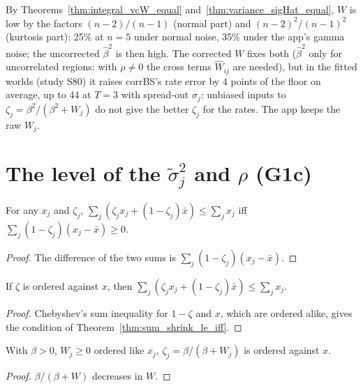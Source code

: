 \begin{remark}\label{rem:vcW}
  By Theorems~\ref{thm:integral_vcW_equal} and~\ref{thm:variance_sigHat_equal}, $W$ is low by the factors
  $(n-2)/(n-1)$ (normal part) and $(n-2)^2/(n-1)^2$ (kurtosis part): 25\% at $n = 5$ under normal noise, 35\%
  under the app's gamma noise; the uncorrected $\hat\beta^2$ is then high. The corrected $W$ fixes both
  ($\hat\beta^2$ only for uncorrelated regions: with $\rho \ne 0$ the cross terms $\hat W_{ij}$ are needed), but in
  the fitted worlds (study S80) it raises corrBS's rate error by 4 points of the floor on average, up to 44
  at $T = 3$ with spread-out $\sigma_j$: unbiased inputs to $\zeta_j = \beta^2/(\beta^2 + W_j)$ do not give the
  better $\zeta_j$ for the rates. The app keeps the raw $W_j$.
\end{remark}

\section{\texorpdfstring{The level of the $\tilde\sigma_j^2$ and $\hat\rho$ (G1c)}{The level of the sigma-tilde and rho-hat (G1c)}}

\begin{theorem}\label{thm:sum_shrink_le_iff}
  \leanok
  For any $x_j$ and $\zeta_j$, $\sum_j(\zeta_jx_j + (1-\zeta_j)\bar x) \le \sum_j x_j$ iff
  $\sum_j(1-\zeta_j)(x_j - \bar x) \ge 0$.
\end{theorem}
\begin{proof}
  \leanok
  The difference of the two sums is $\sum_j(1-\zeta_j)(x_j - \bar x)$.
\end{proof}

\begin{theorem}\label{thm:sum_shrink_le}
  \leanok
  If $\zeta$ is ordered against $x$, then $\sum_j(\zeta_jx_j + (1-\zeta_j)\bar x) \le \sum_j x_j$.
\end{theorem}
\begin{proof}
  \leanok
  Chebyshev's sum inequality for $1 - \zeta$ and $x$, which are ordered alike, gives the condition of
  Theorem~\ref{thm:sum_shrink_le_iff}.
\end{proof}

\begin{lemma}\label{lem:antivary_zeta}
  \leanok
  With $\beta > 0$, $W_j \ge 0$ ordered like $x_j$, $\zeta_j = \beta/(\beta + W_j)$ is ordered against $x$.
\end{lemma}
\begin{proof}
  \leanok
  $\beta/(\beta + W)$ decreases in $W$.
\end{proof}

